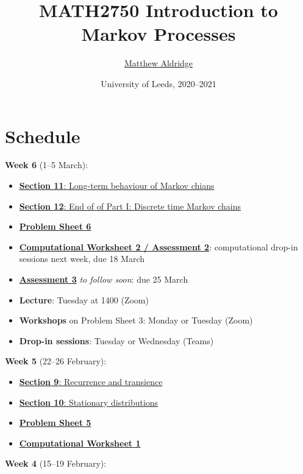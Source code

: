 \documentclass[
  a4paper,
]{article}
\title{MATH2750 Introduction to Markov Processes}
\author{\href{mailto:m.aldridge@leeds.ac.uk}{Matthew Aldridge}}
\date{University of Leeds, 2020--2021}
\providecommand{\tightlist}{%
  \setlength{\itemsep}{0pt}\setlength{\parskip}{0pt}}
\theoremstyle{definition}
\theoremstyle{definition}
\theoremstyle{definition}
\theoremstyle{remark}
\begin{document}
\maketitle

{
\setcounter{tocdepth}{2}
\tableofcontents
}
\hypertarget{home}{%
\section*{Schedule}\label{home}}

\textbf{Week 6} (1--5 March):

\begin{itemize}
\tightlist
\item
  \protect\hyperlink{S11-long-term-chains}{\textbf{Section 11}: Long-term behaviour of Markov chians}
\item
  \protect\hyperlink{S12-revision-i}{\textbf{Section 12}: End of of Part I: Discrete time Markov chains}
\item
  \protect\hyperlink{P06}{\textbf{Problem Sheet 6}}
\item
  \protect\hyperlink{computing}{\textbf{Computational Worksheet 2 / Assessment 2}}: computational drop-in sessions next week, due 18 March
\item
  \protect\hyperlink{A3}{\textbf{Assessment 3}} \emph{to follow soon}: due 25 March
\item
  \textbf{Lecture}: Tuesday at 1400 (Zoom)
\item
  \textbf{Workshops} on Problem Sheet 3: Monday or Tuesday (Zoom)
\item
  \textbf{Drop-in sessions}: Tuesday or Wednesday (Teams)
\end{itemize}

\textbf{Week 5} (22--26 February):

\begin{itemize}
\tightlist
\item
  \protect\hyperlink{S09-recurrence-transience}{\textbf{Section 9}: Recurrence and transience}
\item
  \protect\hyperlink{S10-stationary-distributions}{\textbf{Section 10}: Stationary distributions}
\item
  \protect\hyperlink{P05}{\textbf{Problem Sheet 5}}
\item
  \protect\hyperlink{computing}{\textbf{Computational Worksheet 1}}
\end{itemize}

\textbf{Week 4} (15--19 February):
\end{document}

